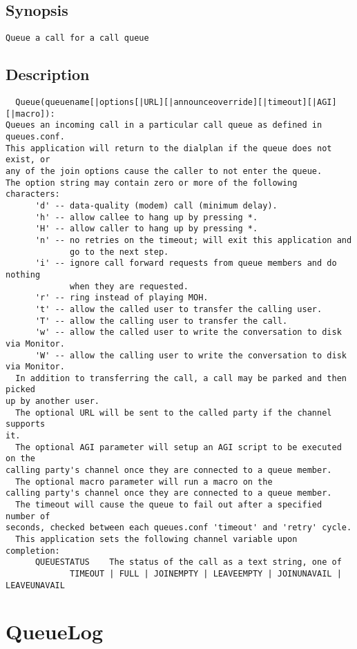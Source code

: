 \subsection{Synopsis}
\begin{verbatim}
Queue a call for a call queue
\end{verbatim}
\subsection{Description}
\begin{verbatim}
  Queue(queuename[|options[|URL][|announceoverride][|timeout][|AGI][|macro]):
Queues an incoming call in a particular call queue as defined in queues.conf.
This application will return to the dialplan if the queue does not exist, or
any of the join options cause the caller to not enter the queue.
The option string may contain zero or more of the following characters:
      'd' -- data-quality (modem) call (minimum delay).
      'h' -- allow callee to hang up by pressing *.
      'H' -- allow caller to hang up by pressing *.
      'n' -- no retries on the timeout; will exit this application and 
             go to the next step.
      'i' -- ignore call forward requests from queue members and do nothing
             when they are requested.
      'r' -- ring instead of playing MOH.
      't' -- allow the called user to transfer the calling user.
      'T' -- allow the calling user to transfer the call.
      'w' -- allow the called user to write the conversation to disk via Monitor.
      'W' -- allow the calling user to write the conversation to disk via Monitor.
  In addition to transferring the call, a call may be parked and then picked
up by another user.
  The optional URL will be sent to the called party if the channel supports
it.
  The optional AGI parameter will setup an AGI script to be executed on the 
calling party's channel once they are connected to a queue member.
  The optional macro parameter will run a macro on the 
calling party's channel once they are connected to a queue member.
  The timeout will cause the queue to fail out after a specified number of
seconds, checked between each queues.conf 'timeout' and 'retry' cycle.
  This application sets the following channel variable upon completion:
      QUEUESTATUS    The status of the call as a text string, one of
             TIMEOUT | FULL | JOINEMPTY | LEAVEEMPTY | JOINUNAVAIL | LEAVEUNAVAIL

\end{verbatim}


\section{QueueLog}
